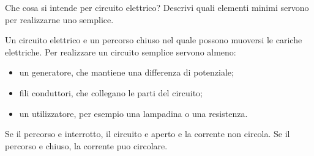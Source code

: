 
\begin{esercizio}
Che cosa si intende per circuito elettrico? Descrivi quali elementi minimi
servono per realizzarne uno semplice.
\end{esercizio}

\begin{soluzione}
Un circuito elettrico e un percorso chiuso nel quale possono muoversi le
cariche elettriche. Per realizzare un circuito semplice servono almeno:
\begin{itemize}
  \item un generatore, che mantiene una differenza di potenziale;
  \item fili conduttori, che collegano le parti del circuito;
  \item un utilizzatore, per esempio una lampadina o una resistenza.
\end{itemize}

Se il percorso e interrotto, il circuito e aperto e la corrente non circola.
Se il percorso e chiuso, la corrente puo circolare.
\end{soluzione}
